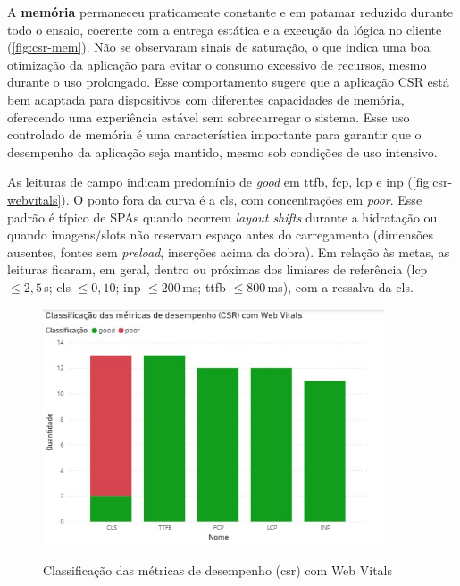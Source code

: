 {A \textbf{memória} permaneceu praticamente constante e em patamar reduzido durante todo o ensaio, coerente com a entrega estática e a execução da lógica no cliente (\autoref{fig:csr-mem}). Não se observaram sinais de saturação, o que indica uma boa otimização da aplicação para evitar o consumo excessivo de recursos, mesmo durante o uso prolongado. Esse comportamento sugere que a aplicação CSR está bem adaptada para dispositivos com diferentes capacidades de memória, oferecendo uma experiência estável sem sobrecarregar o sistema. Esse uso controlado de memória é uma característica importante para garantir que o desempenho da aplicação seja mantido, mesmo sob condições de uso intensivo.

\clearpage
As leituras de campo indicam predomínio de \textit{good} em \acrshort{ttfb}, \acrshort{fcp}, \acrshort{lcp} e \acrshort{inp} (\autoref{fig:csr-webvitals}). O ponto fora da curva é a \acrshort{cls}, com concentrações em \textit{poor}. Esse padrão é típico de SPAs quando ocorrem \emph{layout shifts} durante a hidratação ou quando imagens/slots não reservam espaço antes do carregamento (dimensões ausentes, fontes sem \emph{preload}, inserções acima da dobra). Em relação às metas, as leituras ficaram, em geral, dentro ou próximas dos limiares de referência (\acrshort{lcp} $\leq 2{,}5$\,s; \acrshort{cls} $\leq 0{,}10$; \acrshort{inp} $\leq 200$\,ms; \acrshort{ttfb} $\leq 800$\,ms), com a ressalva da \acrshort{cls}.

\begin{figure}[h]
\centering
\caption{Classificação das métricas de desempenho (\acrshort{csr}) com Web Vitals}
\includegraphics[width=0.9\textwidth]{media/metricas_csr_web_vitals.jpeg}
\label{fig:csr-webvitals}
\end{figure}

}
